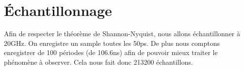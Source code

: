 \documentclass[10pt,a4paper]{article}
\begin{document}
 \section{Échantillonnage} 
 Afin de respecter le théorème de Shannon-Nyquist, nous allons échantillonner à 20GHz. On enregistre un sample toutes les 50ps. De plus nous comptons enregistrer de 100 périodes (de 106.6ns) afin de pouvoir mieux traiter le phénomène à observer. Cela nous fait donc 213200 échantillons.
\end{document}
